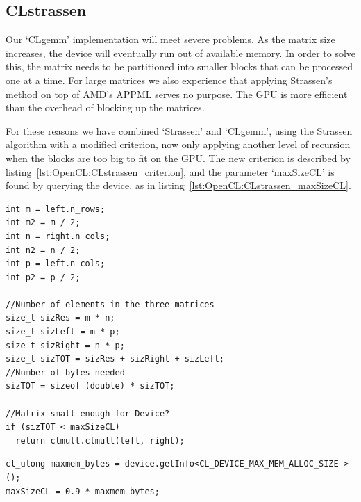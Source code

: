 \subsection{CLstrassen}
Our `CLgemm' implementation will meet severe problems.
As the matrix size increases, the device will eventually run out of available memory. 
In order to solve this, the matrix needs to be partitioned into smaller blocks that can be processed one at a time.
For large matrices we also experience that applying Strassen's method on top of  AMD's APPML serves no purpose.
The GPU is more efficient than the overhead of blocking up the matrices.

For these reasons we have combined `Strassen' and `CLgemm', using the Strassen algorithm with a modified criterion, now only applying another level of recursion when the blocks are too big to fit on the GPU.
The new criterion is described by listing~\ref{lst:OpenCL:CLstrassen_criterion}, and the parameter `maxSizeCL' is found by querying the device, as in listing~\ref{lst:OpenCL:CLstrassen_maxSizeCL}.
\begin{lstlisting}[float,label={lst:OpenCL:CLstrassen_criterion},caption={CLstrassen's new criterion, compared to the original from listing~\ref{lst:OpenCL:Strassen_p1}. Another level of Strassen's algorithm is only applied if matrices are too big to fit on the GPU. Multiplications are then sent to `clmult' instead of armadillo's blas routines.}]
int m = left.n_rows;
int m2 = m / 2;
int n = right.n_cols;
int n2 = n / 2;
int p = left.n_cols;
int p2 = p / 2;

//Number of elements in the three matrices
size_t sizRes = m * n;
size_t sizLeft = m * p;
size_t sizRight = n * p;
size_t sizTOT = sizRes + sizRight + sizLeft;
//Number of bytes needed
sizTOT = sizeof (double) * sizTOT;

//Matrix small enough for Device?
if (sizTOT < maxSizeCL)
  return clmult.clmult(left, right); 
\end{lstlisting}
\begin{lstlisting}[float,label={lst:OpenCL:CLstrassen_maxSizeCL},caption={How to query the max number of bytes on a GPU device available for OpenCL.}]
cl_ulong maxmem_bytes = device.getInfo<CL_DEVICE_MAX_MEM_ALLOC_SIZE > ();
maxSizeCL = 0.9 * maxmem_bytes;
\end{lstlisting}













